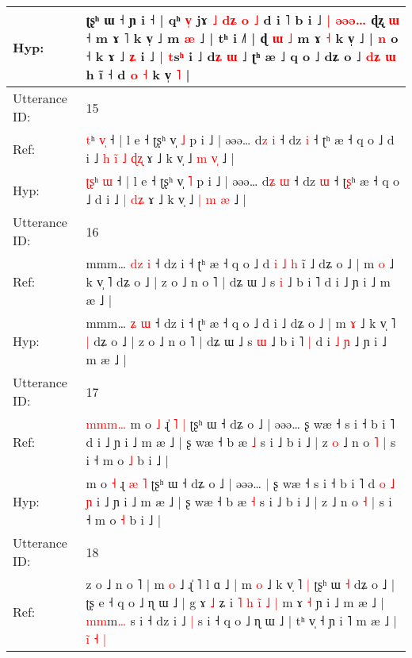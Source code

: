 \documentclass[10pt]{article}
\DeclareRobustCommand{\hl}[1]{{\textcolor{red}{#1}}}
\begin{document}
\begin{longtable}{ll}
 \\
Hyp: & ʈʂʰ ɯ ˧ ɲ i ˧ | qʰ \hl{}\hl{v}\hl{̩} jɤ \hl{˩} \hl{d}\hl{ʑ} \hl{o} \hl{˩} d i ˥ b i ˩\hl{ }\hl{|} \hl{ə}\hl{ə}\hl{ə}\hl{…} ɖʐ \hl{ɯ} ˧ m ɤ ˥ k v̩ ˩ m \hl{}\hl{æ} ˩ | tʰ i ˩˥ | ɖ\hl{} \hl{ɯ} \hl{˩} m ɤ \hl{˧} k v̩ ˩ | \hl{n} o ˧ k ɤ ˩ \hl{ʑ} i ˩ \hl{|} \hl{t}s\hl{ʰ} i ˩ d\hl{ʑ} \hl{ɯ} ˩ ʈʰ æ ˩ q o ˩ dʑ o ˩\hl{}\hl{}\hl{}\hl{}\hl{} \hl{}\hl{}\hl{d}\hl{ʑ} \hl{ɯ} h ĩ ˧ d \hl{}\hl{o} \hl{˧} k v̩ \hl{˥} |
 \\
\midrule
Utterance ID: & 15 \\
Ref: & \hl{}\hl{t}ʰ \hl{v}\hl{̩} ˧ | l e ˧ ʈʂʰ v̩ \hl{˩} p i ˩ | əəə… d\hl{z} \hl{i} ˧ dz \hl{i} ˧ ʈ\hl{}ʰ æ ˧ q o ˩ d i ˩\hl{ }\hl{h}\hl{ }\hl{i}\hl{̃} \hl{˩} \hl{ɖ}\hl{ʐ} ɤ ˩ k v̩ ˩ \hl{m} \hl{}\hl{v}\hl{̩} ˩ |
 \\
Hyp: & \hl{ʈ}\hl{ʂ}ʰ \hl{}\hl{ɯ} ˧ | l e ˧ ʈʂʰ v̩ \hl{˥} p i ˩ | əəə… d\hl{ʑ} \hl{ɯ} ˧ dz \hl{ɯ} ˧ ʈ\hl{ʂ}ʰ æ ˧ q o ˩ d i ˩\hl{}\hl{}\hl{}\hl{}\hl{} \hl{|} \hl{d}\hl{ʑ} ɤ ˩ k v̩ ˩ \hl{|} \hl{m}\hl{ }\hl{æ} ˩ |
 \\
\midrule
Utterance ID: & 16 \\
Ref: & mmm… \hl{d}\hl{z} \hl{i} ˧ dz i ˧ ʈʰ æ ˧ q o ˩ d\hl{ }\hl{i}\hl{ }\hl{˩}\hl{ }\hl{h} i\hl{̃} ˩ dʑ o ˩ | m \hl{o} ˩ k v̩ ˥\hl{}\hl{} dʑ o ˩ | z o ˩ n o ˥ | dʑ ɯ ˩ s \hl{i} ˩ b i ˥\hl{}\hl{} d i\hl{}\hl{}\hl{}\hl{} ˩ ɲ i ˩ m æ ˩ |
 \\
Hyp: & mmm… \hl{}\hl{ʑ} \hl{ɯ} ˧ dz i ˧ ʈʰ æ ˧ q o ˩ d\hl{}\hl{}\hl{}\hl{}\hl{}\hl{} i\hl{} ˩ dʑ o ˩ | m \hl{ɤ} ˩ k v̩ ˥\hl{ }\hl{|} dʑ o ˩ | z o ˩ n o ˥ | dʑ ɯ ˩ s \hl{ɯ} ˩ b i ˥\hl{ }\hl{|} d i\hl{ }\hl{˩}\hl{ }\hl{ɲ} ˩ ɲ i ˩ m æ ˩ |
 \\
\midrule
Utterance ID: & 17 \\
Ref: & \hl{m}\hl{m}\hl{m}\hl{…}\hl{ }m o \hl{˩} ɻ\hl{̍} \hl{˥} \hl{|} ʈʂʰ ɯ ˧ dʑ o ˩ | əəə…\hl{}\hl{} ʂ wæ ˧ s i ˧ b i ˥ d\hl{}\hl{}\hl{}\hl{}\hl{}\hl{} i ˩ ɲ i ˩ m æ ˩ | ʂ wæ ˧ b æ \hl{˩} s i ˩ b i ˩ | z\hl{ }\hl{o} ˩ n o \hl{˥} | s i ˧ m o \hl{˩} b i ˩ |
 \\
Hyp: & \hl{}\hl{}\hl{}\hl{}\hl{}m o \hl{˧} ɻ\hl{} \hl{æ} \hl{˥} ʈʂʰ ɯ ˧ dʑ o ˩ | əəə…\hl{ }\hl{|} ʂ wæ ˧ s i ˧ b i ˥ d\hl{ }\hl{o}\hl{ }\hl{˩}\hl{ }\hl{ɲ} i ˩ ɲ i ˩ m æ ˩ | ʂ wæ ˧ b æ \hl{˧} s i ˩ b i ˩ | z\hl{}\hl{} ˩ n o \hl{˧} | s i ˧ m o \hl{˧} b i ˩ |
 \\
\midrule
Utterance ID: & 18 \\
Ref: & z o ˩ n o ˥ | m \hl{}\hl{o} ˩ ɻ̍ ˥ l ɑ ˩ | m \hl{o} ˩ k v̩ ˥\hl{ }\hl{|} ʈʂʰ ɯ \hl{˧} dʑ o ˩ | ʈʂ e ˧ q o ˩ ɳ ɯ ˩ | g ɤ \hl{˩} ʑ i\hl{ }\hl{˥} \hl{h} \hl{i}\hl{̃} \hl{˩} \hl{|} m ɤ\hl{ }\hl{˧} ɲ i ˩ m æ ˩ | \hl{m}\hl{m}m\hl{…} s i ˧ dz i ˩\hl{ }\hl{|} s i ˧ q o ˩ ɳ ɯ ˩ | tʰ v̩ ˧ ɲ i ˥ m æ ˩ | \hl{i}̃\hl{ }\hl{˧}\hl{ }\hl{|}

\end{longtable}
\end{document}
